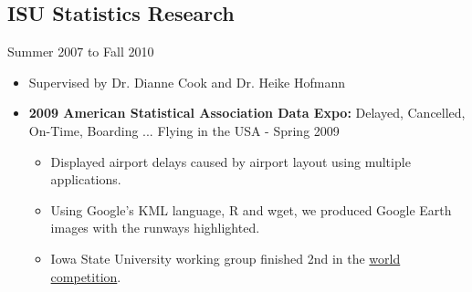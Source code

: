 \documentclass[oneside]{article}
\begin{document}
\subsection{ISU Statistics Research} Summer 2007 to Fall 2010
\begin{itemize}
  \item Supervised by Dr. Dianne Cook and Dr. Heike Hofmann
\end{itemize}

\begin{itemize}
  \item{\bf 2009 American Statistical Association Data Expo:} Delayed, Cancelled, On-Time, Boarding ... Flying in the USA - Spring 2009
    \begin{itemize}      
      \item Displayed airport delays caused by airport layout using multiple applications.
      \item Using Google's KML language, R and wget, we produced Google Earth images with the runways highlighted.
      \item Iowa State University working group finished 2nd in the \href{http://stat-computing.org/dataexpo/2009/posters/}{world competition}.
    \end{itemize}
    
    


\end{itemize}
\end{document}
